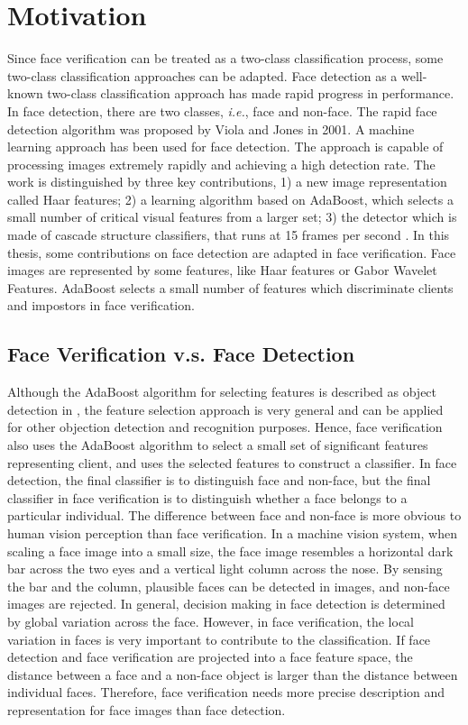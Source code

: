 \section{Motivation}
\label{sec:motivation}
Since face verification can be treated as a two-class classification process, some two-class classification approaches can be adapted. Face detection as a well-known two-class classification approach has made rapid progress in performance. In face detection, there are two classes, \textit{i.e.}, face and non-face. The rapid face detection algorithm was proposed by Viola and Jones \cite{Viola2001} in 2001. A machine learning approach has been used for face detection. The approach is capable of processing images extremely rapidly and achieving a high detection rate. The work is distinguished by three key contributions, 1) a new image representation called Haar features; 2) a learning algorithm based on AdaBoost, which selects a small number of critical visual features from a larger set; 3) the detector which is made of cascade structure classifiers, that runs at 15 frames per second \cite{Viola2001}. In this thesis, some contributions on face detection are adapted in face verification. Face images are represented by some features, like Haar features or Gabor Wavelet Features. AdaBoost selects a small number of features which discriminate clients and impostors in face verification.

\subsection{Face Verification v.s. Face Detection}
Although the AdaBoost algorithm for selecting features is described as object detection in \cite{Viola2001}, the feature selection approach is very general and can be applied for other objection detection and recognition purposes. Hence, face verification also uses the AdaBoost algorithm to select a small set of significant features representing client, and uses the selected features to construct a classifier.  In face detection, the final classifier is to distinguish face and non-face, but the final classifier in face verification is to distinguish whether a face belongs to a particular individual. The difference between face and non-face is more obvious to human vision perception than face verification. In a machine vision system, when scaling a face image into a small size, the face image resembles a horizontal dark bar across the two eyes and a vertical light column across the nose. By sensing the bar and the column, plausible faces can be detected in images, and non-face images are rejected. In general, decision making in face detection is determined by global variation across the face. However, in face verification, the local variation in faces is very important to contribute to the classification. If face detection and face verification are projected into a face feature space, the distance between a face and a non-face object is larger than the distance between individual faces. Therefore, face verification needs more precise description and representation for face images than face detection.


